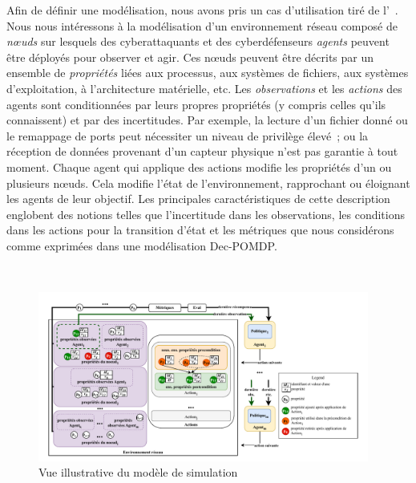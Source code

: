 Afin de définir une modélisation, nous avons pris un cas d'utilisation tiré de l'~\cite{theron_autonomous_2021}. Nous nous intéressons à la modélisation d'un environnement réseau composé de \textit{nœuds} sur lesquels des cyberattaquants et des cyberdéfenseurs \textit{agents} peuvent être déployés pour observer et agir. Ces nœuds peuvent être décrits par un ensemble de \textit{propriétés} liées aux processus, aux systèmes de fichiers, aux systèmes d'exploitation, à l'architecture matérielle, etc.
Les \textit{observations} et les \textit{actions} des agents sont conditionnées par leurs propres propriétés (y compris celles qu'ils connaissent) et par des incertitudes. Par exemple, la lecture d'un fichier donné ou le remappage de ports peut nécessiter un niveau de privilège élevé~; ou la réception de données provenant d'un capteur physique n'est pas garantie à tout moment.
Chaque agent qui applique des actions modifie les propriétés d'un ou plusieurs nœuds. Cela modifie l'état de l'environnement, rapprochant ou éloignant les agents de leur objectif.
Les principales caractéristiques de cette description englobent des notions telles que l'incertitude dans les observations, les conditions dans les actions pour la transition d'état et les métriques que nous considérons comme exprimées dans une modélisation Dec-POMDP.

\

\begin{figure}[]
  \centering
  \includegraphics[width=0.97\textwidth]{figures/model_example_illustration.pdf}
  \caption{Vue illustrative du modèle de simulation}
  \label{fig:model_example_illustration}
\end{figure}

